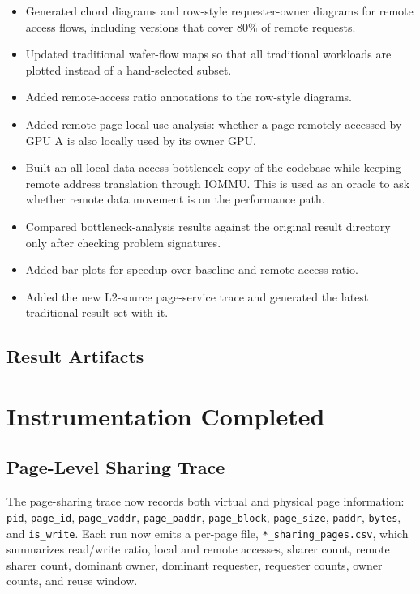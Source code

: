 \documentclass[sigconf,screen,review,anonymous]{acmart}
\begin{document}
\begin{itemize}
  \item Generated chord diagrams and row-style requester-owner diagrams for
  remote access flows, including versions that cover 80\% of remote requests.
  \item Updated traditional wafer-flow maps so that all traditional workloads
  are plotted instead of a hand-selected subset.
  \item Added remote-access ratio annotations to the row-style diagrams.
  \item Added remote-page local-use analysis: whether a page remotely accessed
  by GPU A is also locally used by its owner GPU.
  \item Built an all-local data-access bottleneck copy of the codebase while
  keeping remote address translation through IOMMU.  This is used as an oracle
  to ask whether remote data movement is on the performance path.
  \item Compared bottleneck-analysis results against the original result
  directory only after checking problem signatures.
  \item Added bar plots for speedup-over-baseline and remote-access ratio.
  \item Added the new L2-source page-service trace and generated the latest
  traditional result set with it.
\end{itemize}

\subsection{Result Artifacts}

\begin{table}[t]
  \centering
  \caption{Main result directories and report artifacts produced or used this week.}
  \label{tab:artifacts}
  \resizebox{\textwidth}{!}{}
\end{table}

\section{Instrumentation Completed}

\subsection{Page-Level Sharing Trace}

The page-sharing trace now records both virtual and physical page information:
\texttt{pid}, \texttt{page\_id}, \texttt{page\_vaddr},
\texttt{page\_paddr}, \texttt{page\_block}, \texttt{page\_size},
\texttt{paddr}, \texttt{bytes}, and \texttt{is\_write}.  Each run now emits a
per-page file, \texttt{*\_sharing\_pages.csv}, which summarizes read/write
ratio, local and remote accesses, sharer count, remote sharer count, dominant
owner, dominant requester, requester counts, owner counts, and reuse window.
\end{document}
